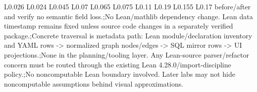 \begin{longtable}{L{0.026\linewidth} L{0.024\linewidth} L{0.045\linewidth} L{0.07\linewidth} L{0.065\linewidth} L{0.075\linewidth} L{0.11\linewidth} L{0.19\linewidth} L{0.155\linewidth} L{0.17\linewidth}}
before/\allowbreak{}after and verify no semantic field loss.;\newline No Lean/\allowbreak{}mathlib dependency change. Lean data timestamp remains fixed unless source code changes in a separately verified package.;\newline Concrete traversal is metadata path: Lean module/\allowbreak{}declaration inventory and YAML rows -> normalized graph nodes/\allowbreak{}edges -> SQL mirror rows -> UI projections.;\newline None in the planning/\allowbreak{}tooling layer. Any Lean-source parser/\allowbreak{}refactor concern must be routed through the existing Lean 4.28.0/\allowbreak{}import-discipline policy.;\newline No noncomputable Lean boundary involved. Later labs may not hide noncomputable assumptions behind visual approximations.\\
\hline
\addlinespace[0.24em]

\end{longtable}
